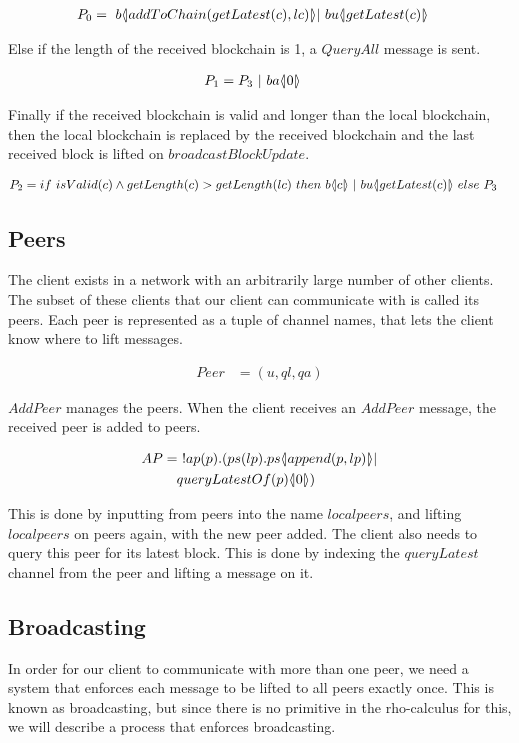 \begin{align*}
	P_0 &=\ b\lift{}{addToChain(getLatest(c),lc)}| \ bu\lift{}{getLatest(c)}
\end{align*}

Else if the length of the received blockchain is 1, a $QueryAll$ message is sent.

\begin{align*}
    P_1 &= P_3\ |\ ba  \langle \! | 0 | \! \rangle
\end{align*}

Finally if the received blockchain is valid and longer than the local blockchain, then the local blockchain is replaced by the received blockchain and the last received block is lifted on $broadcastBlockUpdate$.

\begin{align*}
    P_2 &= if\ isValid(c) \land getLength(c) > getLength(lc)\ then\  b\lift{}{c}\ |\ bu \lift{}{getLatest(c)}\ else\ P_3
\end{align*}

\subsection{Peers}
The client exists in a network with an arbitrarily large number of other clients.
The subset of these clients that our client can communicate with is called its peers.
Each peer is represented as a tuple of channel names, that lets the client know where to lift messages.

\begin{align*}
    Peer &= (u, ql, qa)
\end{align*}

$AddPeer$ manages the peers.
When the client receives an $AddPeer$ message, the received peer is added to peers.

\begin{align*}
    AP &=\ !ap(p).(ps(lp).ps \langle \! | append(p,lp) | \! \rangle|\\
        &\quad queryLatestOf(p) \langle \! | 0 | \! \rangle)\\
\end{align*}

This is done by inputting from peers into the name $localpeers$, and lifting $localpeers$ on peers again, with the new peer added.
The client also needs to query this peer for its latest block.
This is done by indexing the $queryLatest$ channel from the peer and lifting a message on it.

\subsection{Broadcasting} \label{broadcast}
In order for our client to communicate with more than one peer, we need a system that enforces each message to be lifted to all peers exactly once.
This is known as broadcasting, but since there is no primitive in the rho-calculus for this, we will describe a process that enforces broadcasting.

